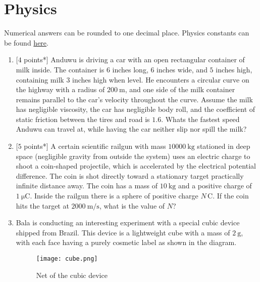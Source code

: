 \newpage 
{}

\section*{\textsf{\textbf{\textcolor{meared}{Physics}}}}
Numerical answers can be rounded to one decimal place. Physics constants can be found \href{https://en.wikipedia.org/wiki/List_of_physical_constants}{here}.
\begin{enumerate}[align=left,start=1,label=\textbf{\textcolor{meared}{Problem \arabic*}}]
    \item {[$4$ points*]}
        Anduwu is driving a car with an open rectangular container of milk inside. The container is $6$ inches long, $6$ inches wide, and $5$ inches high, containing milk $3$ inches high when level. He encounters a circular curve on the highway with a radius of $\qty{200}{\meter}$, and one side of the milk container remains parallel to the car's velocity throughout the curve. Assume the milk has negligible viscosity, the car has negligible body roll, and the coefficient of static friction between the tires and road is $1.6$. Whats the fastest speed Anduwu can travel at, while having the car neither slip nor spill the milk?
    \item {[$5$ points*]} 
         A certain scientific railgun with mass $\qty{10000}{\kilo\gram}$ stationed in deep space (negligible gravity from outside the system) uses an electric charge to shoot a coin-shaped projectile, which is accelerated by the electrical potential difference. The coin is shot directly toward a stationary target practically infinite distance away. The coin has a mass of $\qty{10}{\kilo\gram}$ and a positive charge of $\qty{1}{\micro\coulomb}$. Inside the railgun there is a sphere of positive charge $N\,\unit{\coulomb}$. If the coin hits the target at $\qty[per-mode = symbol]{2000}{\meter\per\second}$, what is the value of $N$?
    \item
        Bala is conducting an interesting experiment with a special cubic device shipped from Brazil. This device is a lightweight cube with a mass of $\qty{2}{\gram}$, with each face having a purely cosmetic label as shown in the diagram.
        \begin{figure}[!ht]
            \centering
            \texttt{[image: cube.png]}
            \caption{Net of the cubic device}
        \end{figure}

\end{enumerate}

